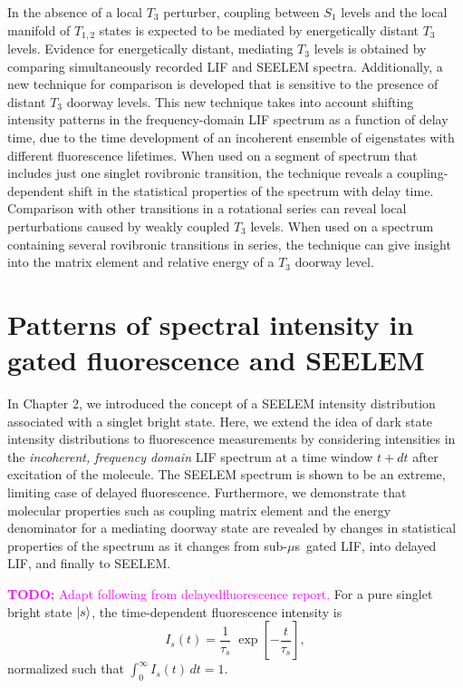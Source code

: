 \documentclass[12pt,draft]{mitthesis}
\newcommand{\TODO} [1]{\textcolor{magenta}{\textbf{TODO:} #1}}
\newcommand{\microsec}{$\mu$s}
\begin{document}
In the absence of a local $T_3$ perturber, coupling between $S_1$
levels and the local manifold of $T_{1,2}$ states is expected to be
mediated by energetically distant $T_3$ levels.  Evidence for
energetically distant, mediating $T_3$ levels is obtained by comparing
simultaneously recorded LIF and SEELEM spectra.  Additionally, a new
technique for comparison is developed that is sensitive to the
presence of distant $T_3$ doorway levels.  This new technique takes
into account shifting intensity patterns in the frequency-domain LIF
spectrum as a function of delay time, due to the time development of
an incoherent ensemble of eigenstates with different fluorescence
lifetimes.  When used on a segment of spectrum that includes just one
singlet rovibronic transition, the technique reveals a
coupling-dependent shift in the statistical properties of the spectrum
with delay time.  Comparison with other transitions in a rotational
series can reveal local perturbations caused by weakly coupled $T_3$
levels.  When used on a spectrum containing several rovibronic
transitions in series, the technique can give insight into the matrix
element and relative energy of a $T_3$ doorway level.

\section{Patterns of spectral intensity in gated fluorescence and
  SEELEM}

In Chapter 2, we introduced the concept of a SEELEM intensity
distribution associated with a singlet bright state.  Here, we extend
the idea of dark state intensity distributions to fluorescence
measurements by considering intensities in the \emph{incoherent,
  frequency domain} LIF spectrum at a time window $t+dt$ after
excitation of the molecule.  The SEELEM spectrum is shown to be an
extreme, limiting case of delayed fluorescence.  Furthermore, we
demonstrate that molecular properties such as coupling matrix element
and the energy denominator for a mediating doorway state are revealed
by changes in statistical properties of the spectrum as it changes
from sub-\microsec\ gated LIF, into delayed LIF, and finally to
SEELEM.

\TODO{Adapt following from delayedfluorescence report.}  For a pure
singlet bright state $\mathinner{|{s}\rangle}$, the time-dependent fluorescence
intensity is
\begin{equation}
  I_s(t) = \frac{1}{\tau_s} \;
           \exp \left[
             -\frac{t}{ \tau_s} 
           \right],
\end{equation}
normalized such that $\int_0^{\infty} I_s(t) \, dt = 1$.
\end{document}
